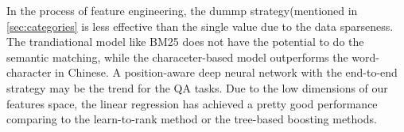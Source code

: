 \documentclass{llncs}
\begin{document}
In the process of feature engineering, the dummp strategy(mentioned in \ref{sec:categories} is less effective than the single value due {\color{red}to} the data sparseness. The trandiational model like BM25 {\color{red}does} not have the potential to do the semantic matching, while the characeter-based model outperforms the word-character in Chinese. A position-aware deep neural network with the end-to-end strategy may be the trend for the QA tasks. Due to the low dimensions of our features space, the linear {\color{red}regression} {\color{red}has} achieved a pretty {\color{red}good} performance comparing to the learn-to-rank method or the tree-based boosting methods.
\end{document}
